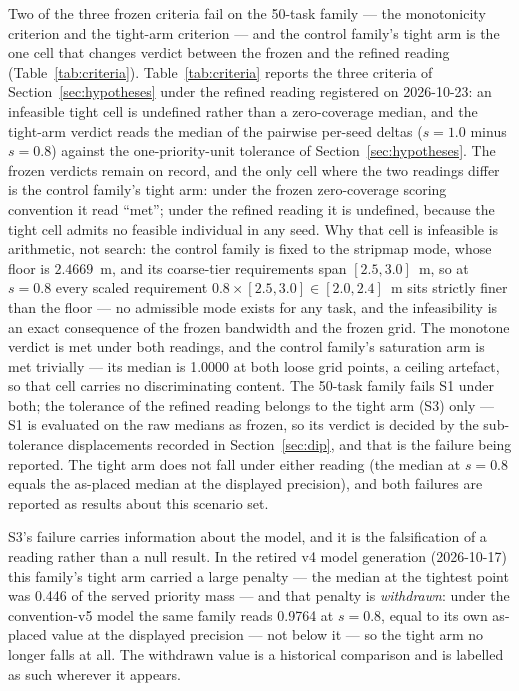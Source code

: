 \documentclass[preprint,authoryear]{elsarticle}
\begin{document}
Two of the three frozen criteria fail on the 50-task family --- the monotonicity criterion and the tight-arm criterion --- and the control family's tight arm is the one cell that changes verdict between the frozen and the refined reading (Table~\ref{tab:criteria}). Table~\ref{tab:criteria} reports the three criteria of Section~\ref{sec:hypotheses} under the refined reading registered on 2026-10-23: an infeasible tight cell is undefined rather than a zero-coverage median, and the tight-arm verdict reads the median of the pairwise per-seed deltas ($s=1.0$ minus $s=0.8$) against the one-priority-unit tolerance of Section~\ref{sec:hypotheses}. The frozen verdicts remain on record, and the only cell where the two readings differ is the control family's tight arm: under the frozen zero-coverage scoring convention it read ``met''; under the refined reading it is undefined, because the tight cell admits no feasible individual in any seed. Why that cell is infeasible is arithmetic, not search: the control family is fixed to the stripmap mode, whose floor is $2.4669$~m, and its coarse-tier requirements span $[2.5, 3.0]$~m, so at $s=0.8$ every scaled requirement $0.8\times[2.5, 3.0]\in[2.0, 2.4]$~m sits strictly finer than the floor --- no admissible mode exists for any task, and the infeasibility is an exact consequence of the frozen bandwidth and the frozen grid. The monotone verdict is met under both readings, and the control family's saturation arm is met trivially --- its median is 1.0000 at both loose grid points, a ceiling artefact, so that cell carries no discriminating content. The 50-task family fails S1 under both; the tolerance of the refined reading belongs to the tight arm (S3) only --- S1 is evaluated on the raw medians as frozen, so its verdict is decided by the sub-tolerance displacements recorded in Section~\ref{sec:dip}, and that is the failure being reported. The tight arm does not fall under either reading (the median at $s=0.8$ equals the as-placed median at the displayed precision), and both failures are reported as results about this scenario set.

S3's failure carries information about the model, and it is the falsification of a reading rather than a null result. In the retired v4 model generation (2026-10-17) this family's tight arm carried a large penalty --- the median at the tightest point was 0.446 of the served priority mass --- and that penalty is \emph{withdrawn}: under the convention-v5 model the same family reads 0.9764 at $s=0.8$, equal to its own as-placed value at the displayed precision --- not below it --- so the tight arm no longer falls at all. The withdrawn value is a historical comparison and is labelled as such wherever it appears.
\end{document}

